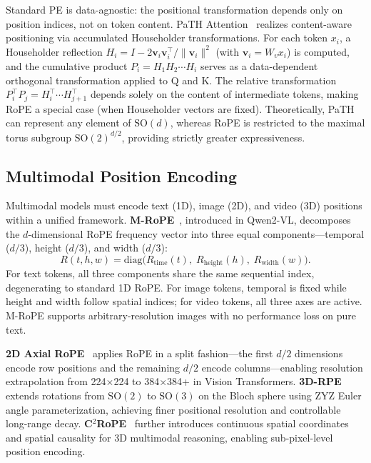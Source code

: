 Standard PE is data-agnostic: the positional transformation depends only on position indices, not on token content. PaTH Attention~\cite{path2025} realizes content-aware positioning via accumulated Householder transformations. For each token $x_i$, a Householder reflection $H_i = I - 2\mathbf{v}_i\mathbf{v}_i^\top / \|\mathbf{v}_i\|^2$ (with $\mathbf{v}_i = W_v x_i$) is computed, and the cumulative product $P_i = H_1 H_2 \cdots H_i$ serves as a data-dependent orthogonal transformation applied to Q and K. The relative transformation $P_i^\top P_j = H_i^\top \cdots H_{j+1}^\top$ depends solely on the content of intermediate tokens, making RoPE a special case (when Householder vectors are fixed). Theoretically, PaTH can represent any element of $\mathrm{SO}(d)$, whereas RoPE is restricted to the maximal torus subgroup $\mathrm{SO}(2)^{d/2}$, providing strictly greater expressiveness.

\subsection{Multimodal Position Encoding}
\label{subsec:multimodal_pe}

Multimodal models must encode text (1D), image (2D), and video (3D) positions within a unified framework. \textbf{M-RoPE}~\cite{qwen2vl2024}, introduced in Qwen2-VL, decomposes the $d$-dimensional RoPE frequency vector into three equal components---temporal ($d/3$), height ($d/3$), and width ($d/3$):
\begin{equation}
  R(t,h,w) = \mathrm{diag}\!\bigl(R_{\mathrm{time}}(t),\; R_{\mathrm{height}}(h),\; R_{\mathrm{width}}(w)\bigr).
  \label{eq:mrope}
\end{equation}
For text tokens, all three components share the same sequential index, degenerating to standard 1D RoPE. For image tokens, temporal is fixed while height and width follow spatial indices; for video tokens, all three axes are active. M-RoPE supports arbitrary-resolution images with no performance loss on pure text.

\textbf{2D Axial RoPE}~\cite{heo2024rope} applies RoPE in a split fashion---the first $d/2$ dimensions encode row positions and the remaining $d/2$ encode columns---enabling resolution extrapolation from 224$\times$224 to 384$\times$384+ in Vision Transformers. \textbf{3D-RPE}~\cite{yang20243drpe} extends rotations from $\mathrm{SO}(2)$ to $\mathrm{SO}(3)$ on the Bloch sphere using ZYZ Euler angle parameterization, achieving finer positional resolution and controllable long-range decay. \textbf{C$^2$RoPE}~\cite{c2rope2026} further introduces continuous spatial coordinates and spatial causality for 3D multimodal reasoning, enabling sub-pixel-level position encoding.

